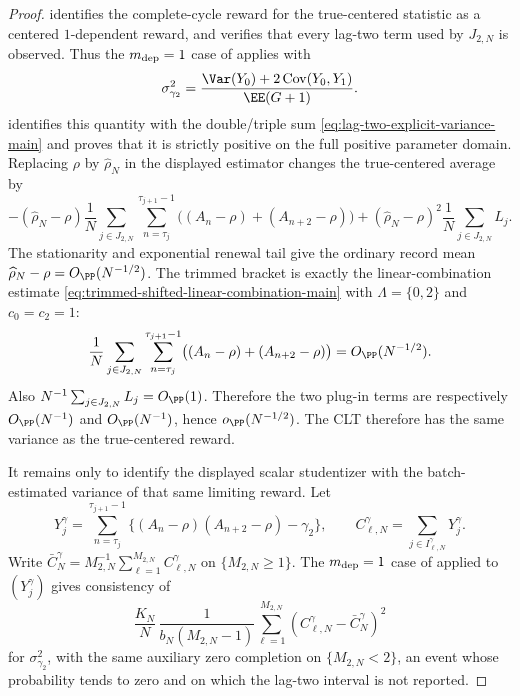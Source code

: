 \begin{proof}
 identifies the complete-cycle reward for the
true-centered statistic as a centered \(1\)-dependent reward, and
 verifies that every lag-two term
used by \(J_{2,N}\) is observed.  Thus the \(m_{\rm dep}=1\) case of
 applies with
\[
\sigma_{\gamma_2}^2
=\frac{\Var(Y_0)+2\operatorname{Cov}(Y_0,Y_1)}{\EE(G+1)}.
\]
 identifies this quantity with
the double/triple sum \eqref{eq:lag-two-explicit-variance-main} and proves
that it is strictly positive on the full positive parameter domain.
Replacing \(\rho\) by \(\widehat\rho_N\) in the displayed estimator changes
the true-centered average by
\[
-(\widehat\rho_N-\rho)\frac1N
\sum_{j\in J_{2,N}}\sum_{n=\tau_j}^{\tau_{j+1}-1}
\bigl((A_n-\rho)+(A_{n+2}-\rho)\bigr)
+(\widehat\rho_N-\rho)^2\frac1N\sum_{j\in J_{2,N}}L_j .
\]
The stationarity and exponential renewal tail give the ordinary record mean
\(\widehat\rho_N-\rho=O_{\PP}(N^{-1/2})\).  The trimmed bracket is exactly the
linear-combination estimate
\eqref{eq:trimmed-shifted-linear-combination-main} with
\(\Lambda=\{0,2\}\) and \(c_0=c_2=1\):
\[
\frac1N
\sum_{j\in J_{2,N}}\sum_{n=\tau_j}^{\tau_{j+1}-1}
\bigl((A_n-\rho)+(A_{n+2}-\rho)\bigr)
=O_{\PP}(N^{-1/2}).
\]
Also \(N^{-1}\sum_{j\in J_{2,N}}L_j=O_{\PP}(1)\).  Therefore the two plug-in
terms are respectively \(O_{\PP}(N^{-1})\) and \(O_{\PP}(N^{-1})\), hence
\(o_{\PP}(N^{-1/2})\).  The CLT therefore has the same variance as the
true-centered reward.

It remains only to identify the displayed scalar studentizer with the
batch-estimated variance of that same limiting reward.  Let
\[
Y^\gamma_j
=\sum_{n=\tau_j}^{\tau_{j+1}-1}
\{(A_n-\rho)(A_{n+2}-\rho)-\gamma_2\},
\qquad
C^\gamma_{\ell,N}=\sum_{j\in I^\gamma_{\ell,N}}Y^\gamma_j .
\]
Write
\(\bar C^\gamma_N=M_{2,N}^{-1}\sum_{\ell=1}^{M_{2,N}}C^\gamma_{\ell,N}\)
on \(\{M_{2,N}\ge1\}\).
The \(m_{\rm dep}=1\) case of
 applied to
\((Y^\gamma_j)\) gives consistency of
\[
\frac{K_N}{N}\,
\frac1{b_N(M_{2,N}-1)}
\sum_{\ell=1}^{M_{2,N}}
\left(C^\gamma_{\ell,N}-\bar C^\gamma_N\right)^2
\]
for \(\sigma_{\gamma_2}^2\), with the same auxiliary zero completion on
\(\{M_{2,N}<2\}\), an event whose probability tends to zero and on which the
lag-two interval is not reported.


\end{proof}
